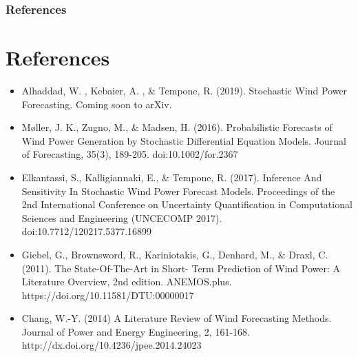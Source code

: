 \documentclass[aspectratio=169]{beamer}\usepackage[utf8]{inputenc}
\begin{document}
\begin{frame}\frametitle{References}


\section*{References}
\begin{flushleft}
\begin{itemize}
\item Alhaddad, W. ,  Kebaier, A. , \& Tempone, R. (2019). Stochastic Wind Power Forecasting. Coming soon to  arXiv.
\item  M\o ller, J. K., Zugno, M., \& Madsen, H. (2016). Probabilistic Forecasts of Wind Power Generation by Stochastic Differential Equation Models. Journal of Forecasting, 35(3), 189-205. doi:10.1002/for.2367 
\item  Elkantassi, S., Kalligiannaki, E., \& Tempone, R. (2017). Inference And Sensitivity In Stochastic Wind Power Forecast Models. Proceedings of the 2nd International Conference on Uncertainty Quantification in Computational Sciences and Engineering (UNCECOMP 2017). doi:10.7712/120217.5377.16899
\item Giebel, G., Brownsword, R., Kariniotakis, G., Denhard, M., \& Draxl, C. (2011). The State-Of-The-Art in Short- Term Prediction of Wind Power: A Literature Overview, 2nd edition. ANEMOS.plus. https://doi.org/10.11581/DTU:00000017 
\item Chang, W.-Y. (2014) A Literature Review of Wind Forecasting Methods. Journal of Power and Energy Engineering, 2, 161-168. http://dx.doi.org/10.4236/jpee.2014.24023
\end{itemize}
\end{flushleft} 

\end{frame}
\end{document}
